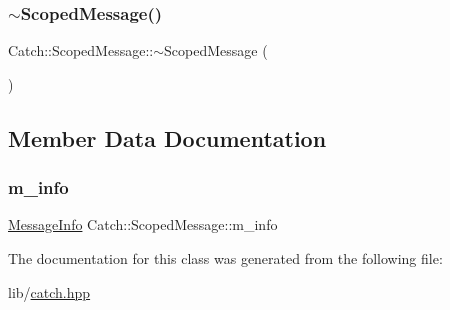 \hypertarget{class_catch_1_1_scoped_message_a43190843f9eeb84a0b42b0bc95fdf93a}{}\label{class_catch_1_1_scoped_message_a43190843f9eeb84a0b42b0bc95fdf93a} 
\subsubsection{\texorpdfstring{$\sim$\+Scoped\+Message()}{~ScopedMessage()}}
{\footnotesize\ttfamily Catch\+::\+Scoped\+Message\+::$\sim$\+Scoped\+Message (\begin{DoxyParamCaption}{ }\end{DoxyParamCaption})}



\subsection{Member Data Documentation}
\hypertarget{class_catch_1_1_scoped_message_ae6e1476f389cc6e1586f033b3747b27b}{}\label{class_catch_1_1_scoped_message_ae6e1476f389cc6e1586f033b3747b27b} 
\subsubsection{\texorpdfstring{m\+\_\+info}{m\_info}}
{\footnotesize\ttfamily \hyperlink{struct_catch_1_1_message_info}{Message\+Info} Catch\+::\+Scoped\+Message\+::m\+\_\+info}



The documentation for this class was generated from the following file\+:\begin{DoxyCompactItemize}
\item 
lib/\hyperlink{catch_8hpp}{catch.\+hpp}\end{DoxyCompactItemize}
